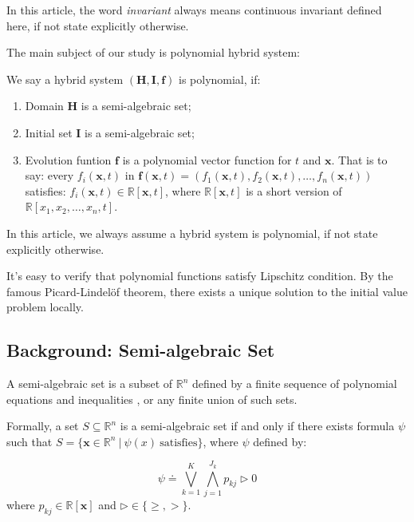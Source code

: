 \documentclass{jssc}
\begin{document}
In this article, the word \emph{invariant} always means continuous invariant defined here, if not state explicitly otherwise.

The main subject of our study is polynomial hybrid system:
\begin{definition}
	We say a hybrid system $(\boldsymbol{H}, \boldsymbol{I}, \boldsymbol{f})$ is polynomial, if:
	\begin{enumerate}
		\item Domain $\boldsymbol{H}$ is a semi-algebraic set;
		\item Initial set $\boldsymbol{I}$ is a semi-algebraic set;
		\item Evolution funtion $\boldsymbol{f}$ is a polynomial vector function for $t$ and $\boldsymbol{x}$. That is to say: every $f_i(\boldsymbol{x}, t)$ in $\boldsymbol{f}(\boldsymbol{x}, t) = (f_1(\boldsymbol{x}, t), f_2(\boldsymbol{x}, t), \dots, f_n(\boldsymbol{x}, t))$ satisfies: $f_i(\boldsymbol{x}, t) \in \mathbb{R}[\boldsymbol{x}, t]$, where $\mathbb{R}[\boldsymbol{x}, t]$ is a short version of $\mathbb{R}[x_1, x_2, \dots, x_n, t]$.
	\end{enumerate}
\end{definition}

In this article, we always assume a hybrid system is polynomial, if not state explicitly otherwise.

It's easy to verify that polynomial functions satisfy Lipschitz condition. By the famous Picard-Lindel\"{o}f theorem, there exists a unique solution to the initial value problem locally.

\subsection{Background: Semi-algebraic Set}
\begin{definition}
\label{def:semialgebra}
A semi-algebraic set is a subset of $\mathbb{R}^n$ defined by a finite sequence of polynomial equations and inequalities , or any finite union of such sets.

Formally, a set $S \subseteq \mathbb{R}^n$ is a semi-algebraic set if and only if there exists formula $\psi$ such that $S = \{\boldsymbol{x} \in \mathbb{R}^n\ |\ \psi(x)\ \text{satisfies} \}$,  where $\psi$ defined by:

\begin{displaymath}
	\psi \doteq \bigvee_{k=1}^{K} \bigwedge_{j=1}^{J_k}p_{kj} \rhd 0
\end{displaymath}
where $p_{kj} \in \mathbb{R}[\boldsymbol{x}]$ and $\rhd \in \{\geq, >\}$.
\end{definition}
\end{document}
